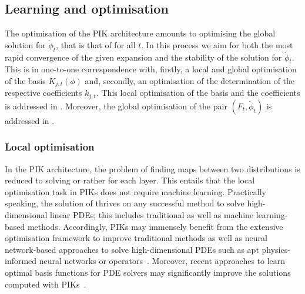 \documentclass[reprint,amsmath,amssymb,aps,pra,superscriptaddress,nofootinbib,twocolumn,floatfix,nolongbibliography]{revtex4-2}
\begin{document}
\subsection{Learning and optimisation}
\label{sec:Optimisation}

The optimisation of the PIK architecture amounts to optimising the global solution for $\dot{\phi}_t$, that is that of  for all $t$. In this process we aim for both the most rapid convergence of the given expansion and the stability of the solution for $\dot{\phi}_t$. This is in one-to-one correspondence with, firstly, a local and global optimisation of the basis $K_{j,t}(\phi)$ and, secondly, an optimisation of the determination of the respective coefficients $k_{j, t}$. This local optimisation of the basis and the coefficients is addressed in . Moreover, the global optimisation of the pair $(F_t, \dot{\phi}_t)$ is addressed in . 


\subsubsection{Local optimisation}
\label{sec:OptimisationSolution}

In the PIK architecture, the problem of finding maps between two distributions is reduced to solving  or rather  for each layer. This entails that the local optimisation task in PIKs does not require machine learning. Practically speaking, the solution of  thrives on any successful method to solve high-dimensional linear PDEs; this includes traditional as well as machine learning-based methods. Accordingly, PIKs may immensely benefit from the extensive optimisation framework to improve traditional methods as well as neural network-based approaches to solve high-dimensional PDEs such as apt physics-informed neural networks or operators~\cite{Rassi:2019zul, Li:2023pino, Richter-Powell:2022xww}. Moreover, recent approaches to learn optimal basis functions for PDE solvers may significantly improve the solutions computed with PIKs~\cite{Weng:2025dcm}.
\end{document}
